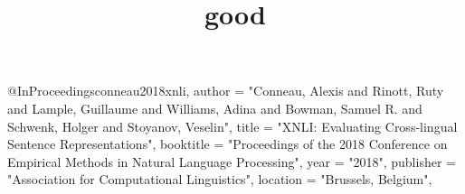 \documentclass[12pt]{report}
\begin{document}
\title{good}
@InProceedings{conneau2018xnli,
  author =  "Conneau, Alexis
                  and Rinott, Ruty
                  and Lample, Guillaume
                  and Williams, Adina
                  and Bowman, Samuel R.
                  and Schwenk, Holger
                  and Stoyanov, Veselin",
  title =   "XNLI: Evaluating Cross-lingual Sentence Representations",
  booktitle =   "Proceedings of the 2018 Conference on Empirical Methods in Natural Language Processing",
  year =    "2018",
  publisher =   "Association for Computational Linguistics",
  location =    "Brussels, Belgium",
}
\end{document}
